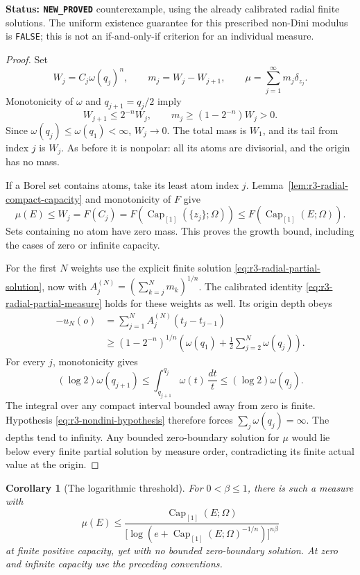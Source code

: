 \documentclass[11pt,a4paper]{article}
\numberwithin{equation}{section}
\newtheorem{corollary}[theorem]{Corollary}
\theoremstyle{definition}
\theoremstyle{remark}
\begin{document}
\noindent\textbf{Status: \texttt{NEW\_PROVED}} counterexample,
using the already calibrated radial finite solutions. The uniform
existence guarantee for this prescribed non-Dini modulus is
\texttt{FALSE}; this is not an if-and-only-if criterion for an
individual measure.

\begin{proof}
Set
\[
 W_j=C_j\omega(q_j)^n,\qquad m_j=W_j-W_{j+1},\qquad
 \mu=\sum_{j=1}^{\infty}m_j\delta_{z_j}.
\]
Monotonicity of $\omega$ and $q_{j+1}=q_j/2$ imply
\begin{equation}
 W_{j+1}\leq2^{-n}W_j,\qquad
 m_j\geq(1-2^{-n})W_j>0.
 \label{eq:r3-modulus-tail-ratio}
\end{equation}
Since $\omega(q_j)\leq\omega(q_1)<\infty$, $W_j\to0$.
The total mass is $W_1$, and its tail from index $j$ is $W_j$.
As before it is nonpolar: all its atoms are divisorial, and the
origin has no mass.

If a Borel set contains atoms, take its least atom index $j$.
Lemma~\ref{lem:r3-radial-compact-capacity} and monotonicity of
$F$ give
\[
 \mu(E)\leq W_j=F(C_j)
 =F(\operatorname{Cap}_{[1]}(\{z_j\};\Omega))
 \leq F(\operatorname{Cap}_{[1]}(E;\Omega)).
\]
Sets containing no atom have zero mass. This proves the growth
bound, including the cases of zero or infinite capacity.

For the first $N$ weights use the explicit finite solution
\eqref{eq:r3-radial-partial-solution}, now with
$A_j^{(N)}=(\sum_{k=j}^Nm_k)^{1/n}$.
The calibrated identity \eqref{eq:r3-radial-partial-measure}
holds for these weights as well. Its origin depth obeys
\[
 \begin{split}
 -u_N(o)
 &=\sum_{j=1}^N A_j^{(N)}(t_j-t_{j-1})\\
 &\geq(1-2^{-n})^{1/n}
       \left(\omega(q_1)+\frac12\sum_{j=2}^N\omega(q_j)\right).
 \end{split}
\]
For every $j$, monotonicity gives
\[
 (\log2)\omega(q_{j+1})
 \leq\int_{q_{j+1}}^{q_j}\omega(t)\,\frac{dt}{t}
 \leq(\log2)\omega(q_j).
\]
The integral over any compact interval bounded away from zero
is finite. Hypothesis \eqref{eq:r3-nondini-hypothesis} therefore
forces $\sum_j\omega(q_j)=\infty$. The depths tend to infinity.
Any bounded zero-boundary solution for $\mu$ would lie below
every finite partial solution by measure order, contradicting
its finite actual value at the origin.
\end{proof}

\begin{corollary}[The logarithmic threshold]
\label{cor:r3-logarithmic-modulus-obstruction}
For $0<\beta\leq1$, there is such a measure with
\[
 \mu(E)\leq
 \frac{\operatorname{Cap}_{[1]}(E;\Omega)}
 {\bigl[\log(e+\operatorname{Cap}_{[1]}(E;\Omega)^{-1/n})\bigr]^{n\beta}}
\]
at finite positive capacity, yet with no bounded zero-boundary
solution. At zero and infinite capacity use the preceding
conventions.
\end{corollary}
\end{document}

